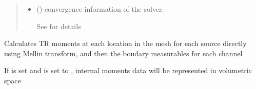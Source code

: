 \documentclass[letterpaper,10pt,english]{sphinxmanual}
\begin{document}
\begin{fulllineitems}
\begin{fulllineitems}
\begin{quote}
\begin{description}
\begin{itemize}
\sphinxAtStartPar
See {\hyperref[\detokenize{_autosummary/nirfasterff.base.data.FDdata:nirfasterff.base.data.FDdata}]{}} for details.

\item {} 
\sphinxAtStartPar
{} () \textendash{} convergence information of the solver.

\sphinxAtStartPar
See {\hyperref[\detokenize{_autosummary/nirfasterff.utils.ConvergenceInfo:nirfasterff.utils.ConvergenceInfo}]{}} for details

\end{itemize}


\end{description}\end{quote}

\end{fulllineitems}


\begin{fulllineitems}
\label{\detokenize{_autosummary/nirfasterff.base.stnd_mesh.stndmesh:nirfasterff.base.stnd_mesh.stndmesh.femdata_moments}}
\pysigstartsignatures
\pysiglinewithargsret
{}
{\sphinxparamcomma {}\sphinxparamcomma {}\sphinxparamcomma {}}
{}
\pysigstopsignatures
\sphinxAtStartPar
Calculates TR moments at each location in the mesh for each source directly using Mellin transform, and then the boudary measurables for each channel

\sphinxAtStartPar
If  is set and  is set to , internal moments data will be represented in volumetric space


\end{fulllineitems}
\end{fulllineitems}
\end{document}
